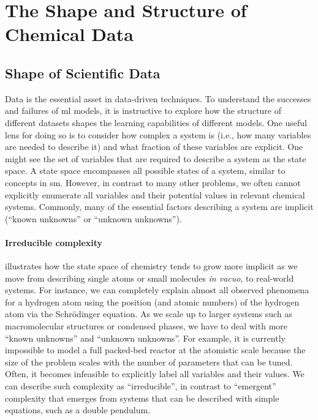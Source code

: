 \section{The Shape and Structure of Chemical Data} \label{sec:data-section}


\subsection{Shape of Scientific Data}
Data is the essential asset in data-driven techniques. 
To understand the successes and failures of \gls{ml} models, it is instructive to explore how the structure of different datasets shapes the learning capabilities of different models. 
One useful lens for doing so is to consider how complex a system is (i.e., how many variables are needed to describe it) and what fraction of these variables are explicit. 
One might see the set of variables that are required to describe a system as the state space. A state space encompasses all possible states of a system, similar to concepts in \gls{sm}.  
However, in contrast to many other problems, we often cannot explicitly enumerate all variables and their potential values in relevant chemical systems. Commonly, many of the essential factors describing a system are implicit (\enquote{known unknowns} or \enquote{unknown unknowns}). 

\paragraph{Irreducible complexity}
 illustrates how the state space of chemistry tends to grow more implicit as we move from describing single atoms or small molecules \textit{in vacuo}, to real-world systems. 
For instance, we can completely explain almost all observed phenomena for a hydrogen atom using the position (and atomic numbers) of the hydrogen atom via the Schrödinger equation. 
As we scale up to larger systems such as macromolecular structures or condensed phases, we have to deal with more \enquote{known unknowns} and \enquote{unknown unknowns}.\autocite{martin2022bridging}
For example, it is currently impossible to model a full packed-bed reactor at the atomistic scale because the size of the problem scales with the number of parameters that can be tuned. Often, it becomes infeasible to explicitly label all variables and their values. 
We can describe such complexity as \enquote{irreducible}\autocite{Pietsch_2017}, in contrast to \enquote{emergent} complexity that emerges from systems that can be described with simple equations, such as a double pendulum.


